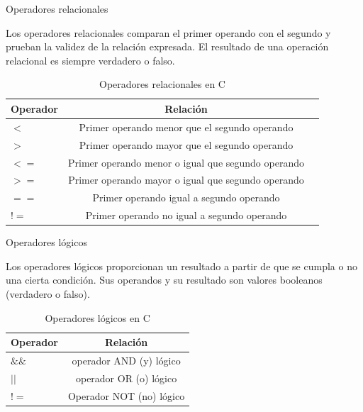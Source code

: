 \documentclass[xcolor=pdftex,table,11pt]{beamer}
\begin{document}
\begin{frame}{Operadores relacionales}
\begin{block}{}
Los operadores relacionales comparan el primer operando con el segundo y prueban la validez de la relación expresada. El resultado de una operación relacional es siempre verdadero o falso.
\end{block}



\begin{table}
\begin{tabular}{l | c | l }
Operador & Relación \\
\hline \hline
$<$ & Primer operando menor que el segundo operando \\ 
$>$ & 	Primer operando mayor que el segundo operando\\ 
$<=$ & 	Primer operando menor o igual que segundo operando \\ 
$>=$ & Primer operando mayor o igual que segundo operando \\ 
$==$ & Primer operando igual a segundo operando \\ 
$!=$ & Primer operando no igual a segundo operando\\ 
\end{tabular}
\caption{Operadores relacionales en C}
\end{table}


\end{frame}


\begin{frame}{Operadores lógicos}
\begin{block}{}
Los operadores lógicos proporcionan un resultado a partir de que se cumpla o no una cierta condición. Sus operandos y su resultado son valores booleanos (verdadero o falso).
\end{block}



\begin{table}
\begin{tabular}{l | c}
Operador & Relación \\
\hline \hline
$\&\&$ &  operador AND (y) lógico \\ 
$||$ & 	operador OR  (o) lógico\\ 
$!=$ & 	Operador NOT (no) lógico \\ 
\end{tabular}
\caption{Operadores lógicos en C}
\end{table}

\end{frame}
\end{document}
